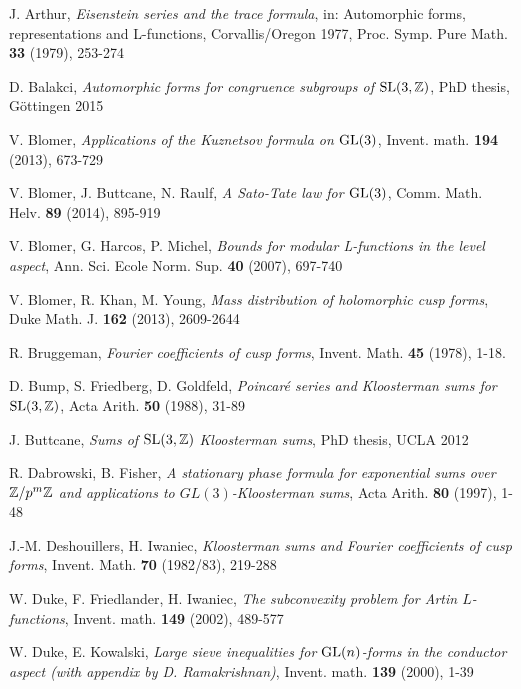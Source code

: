 \documentclass[11pt]{amsart}
\theoremstyle{plain}
\numberwithin{equation}{section}
\theoremstyle{definition}
\begin{document}
 \begin{thebibliography}{BHM}
 
 J. Arthur, \emph{Eisenstein series and the trace formula}, in: Automorphic forms, representations and L-functions, Corvallis/Oregon 1977, Proc. Symp. Pure Math. \textbf{33} (1979), 253-274
 
 D. Balakci, \emph{Automorphic forms for congruence subgroups of ${\rm SL}(3,\Bbb{Z})$},  PhD thesis, G\"ottingen 2015

 
 V. Blomer, \emph{Applications of the Kuznetsov formula on ${\rm GL}(3)$}, Invent. math. \textbf{194} (2013), 673-729

 V. Blomer, J. Buttcane, N. Raulf, \emph{A Sato-Tate law for ${\rm GL}(3)$}, Comm. Math. Helv. \textbf{89} (2014), 895-919

 V. Blomer, G. Harcos, P. Michel, \emph{Bounds for modular L-functions in the level aspect}, Ann. Sci. Ecole Norm. Sup. \textbf{40} (2007), 697-740

 V. Blomer, R. Khan, M. Young, \emph{Mass distribution of holomorphic cusp forms}, Duke Math. J. \textbf{162} (2013), 2609-2644

 
 

 R. Bruggeman, \emph{Fourier coefficients of cusp forms},   Invent. Math.  \textbf{45}  (1978),  1-18. 

 
 D. Bump, S. Friedberg, D.  Goldfeld, \emph{Poincar\'e series and Kloosterman sums for ${\rm SL}(3, \Bbb{Z})$},   Acta Arith.  \textbf{50}  (1988),   31-89

 J. Buttcane, \emph{Sums of ${\rm SL}(3,\Bbb{Z})$ Kloosterman sums}, PhD thesis, UCLA 2012

 
 
 R. Dabrowski, B. Fisher, \emph{A stationary phase formula for exponential sums over $\Bbb{Z}/p^m\Bbb{Z}$ and applications to $GL(3)$-Kloosterman sums}, Acta Arith. \textbf{80} (1997), 1-48

 J.-M. Deshouillers, H. Iwaniec,  \emph{Kloosterman sums and Fourier coefficients of cusp forms},   Invent. Math.  \textbf{70}  (1982/83),  219-288

 
 W. Duke, F. Friedlander, H. Iwaniec, \emph{The subconvexity problem for Artin $L$-functions}, Invent. math. \textbf{149} (2002), 489-577 

 W. Duke, E. Kowalski, \emph{Large sieve inequalities for ${\rm GL}(n)$-forms in the conductor aspect (with appendix by D. Ramakrishnan)}, Invent. math. \textbf{139} (2000), 1-39


\end{thebibliography}
\end{document}
